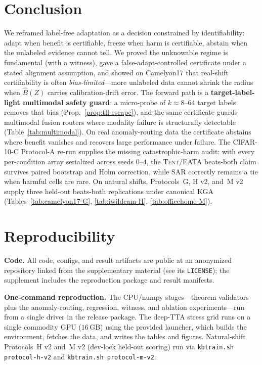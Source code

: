 \documentclass[conference]{IEEEtran}
\theoremstyle{plain}
\theoremstyle{definition}
\begin{document}
\section{Conclusion}
We reframed label-free adaptation as a decision constrained by identifiability: adapt
when benefit is certifiable, freeze when harm is certifiable, abstain when the
unlabeled evidence cannot tell. We proved the unknowable regime is fundamental (with a
witness), gave a false-adapt-controlled certificate under a stated alignment
assumption, and showed on Camelyon17 that real-shift certifiability is often
\emph{bias-limited}---more unlabeled data cannot shrink the radius when $\widehat{B}(Z)$
carries calibration-drift error. The forward path is a \textbf{target-label-light
multimodal safety guard}: a micro-probe of $k{\approx}8$--$64$ target labels removes that
bias (Prop.~\ref{prop:tll-escape}), and the same certificate guards multimodal fusion routers
where modality failure is structurally detectable (Table~\ref{tab:multimodal}). On real
anomaly-routing data the certificate abstains where benefit vanishes and recovers large
performance under failure. The CIFAR-10-C Protocol-A re-run supplies the missing
catastrophic-harm audit: with every per-condition array serialized across seeds $0$--$4$,
the \textsc{Tent}/\textsc{EATA} beats-both claim survives paired bootstrap and Holm
correction, while \textsc{SAR} correctly remains a tie when harmful cells are rare.
On natural shifts, Protocols~G, H v2, and~M v2 supply three held-out beats-both
replications under canonical \textsc{KGA} (Tables~\ref{tab:camelyon17-G},
\ref{tab:iwildcam-H}, \ref{tab:officehome-M}).

\section{Reproducibility}\label{sec:repro}
\textbf{Code.} All code, configs, and result artifacts are public at
an anonymized repository linked from the supplementary material (see its \texttt{LICENSE}); the
supplement includes the reproduction package and result manifests.

\noindent\textbf{One-command reproduction.} The CPU/numpy stages---theorem validators plus the
anomaly-routing, regression, witness, and ablation experiments---run from a single driver in the
release package. The deep-TTA stress grid runs on a single commodity GPU ($16$\,GB) using the
provided launcher, which builds the environment, fetches the data, and writes the tables and figures.
Natural-shift Protocols~H v2 and~M v2 (dev-lock held-out scoring) run via
\texttt{kbtrain.sh protocol-h-v2} and \texttt{kbtrain.sh protocol-m-v2}.
\end{document}

